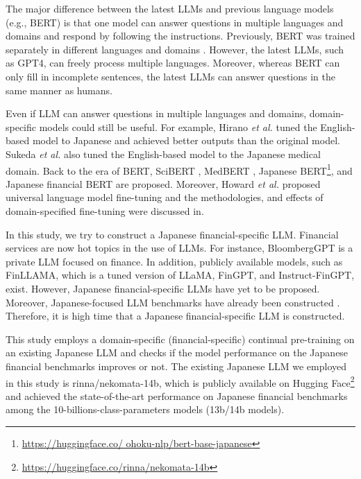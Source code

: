 The major difference between the latest LLMs and previous language models (e.g., BERT) is that one model can answer questions in multiple languages and domains and respond by following the instructions.
Previously, BERT was trained separately in different languages and domains \cite{Suzuku2023-ipm}.
However, the latest LLMs, such as GPT4, can freely process multiple languages.
Moreover, whereas BERT can only fill in incomplete sentences, the latest LLMs can answer questions in the same manner as humans.

Even if LLM can answer questions in multiple languages and domains, domain-specific models could still be useful.
For example, Hirano {\it et al.} \cite{Hirano2023-nbis} tuned the English-based model to Japanese and achieved better outputs than the original model.
Sukeda {\it et al.} \cite{sukeda2023jmedlora} also tuned the English-based model to the Japanese medical domain.
Back to the era of BERT, SciBERT \cite{beltagy2019scibert}, MedBERT \cite{rasmy2021med}, Japanese BERT\footnote{\url{https://huggingface.co/ ohoku-nlp/bert-base-japanese}}, and Japanese financial BERT \cite{Suzuki2022-sigfin28} are proposed.
Moreover, Howard {\it et al.} \cite{howard2018ulmfit} proposed universal language model fine-tuning and the methodologies, and effects of domain-specified fine-tuning were discussed in\cite{gururangan2020don,Suzuku2023-ipm}.

In this study, we try to construct a Japanese financial-specific LLM.
Financial services are now hot topics in the use of LLMs.
For instance, BloombergGPT\cite{Wu2023} is a private LLM focused on finance.
In addition, publicly available models, such as FinLLAMA\cite{Fin-LLAMA}, which is a tuned version of LLaMA\cite{touvron2023llama}, FinGPT\cite{yang2023fingpt}, and Instruct-FinGPT\cite{zhang2023instruct}, exist.
However, Japanese financial-specific LLMs have yet to be proposed.
Moreover, Japanese-focused LLM benchmarks have already been constructed \cite{Hirano2023-finnlpkdf}.
Therefore, it is high time that a Japanese financial-specific LLM is constructed.

This study employs a domain-specific (financial-specific) continual pre-training on an existing Japanese LLM and checks if the model performance on the Japanese financial benchmarks \cite{Hirano2023-finnlpkdf} improves or not.
The existing Japanese LLM we employed in this study is rinna/nekomata-14b, which is publicly available on Hugging Face\footnote{\url{https://huggingface.co/rinna/nekomata-14b}} and achieved the state-of-the-art performance on Japanese financial benchmarks among the 10-billions-class-parameters models (13b/14b models).

